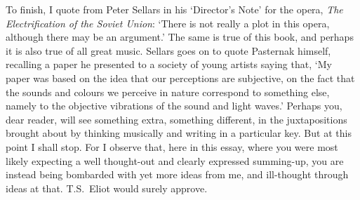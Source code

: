 To finish, I quote from Peter Sellars in his `Director's Note' for the
opera, \textit{The Electrification of the Soviet Union}: `There is not
really a plot in this opera, although there may be an argument.'  The
same is true of this book, and perhaps it is also true of all great music.  Sellars goes on to quote Pasternak
himself, recalling a paper he presented to a society of young artists
saying that, `My paper was based on the idea that our perceptions are
subjective, on the fact that the sounds and colours we perceive in
nature correspond to something else, namely to the objective
vibrations of the sound and light waves.'  Perhaps you, dear reader,
will see something extra, something different, in the juxtapositions
brought about by thinking musically and writing in a particular key.
But at this point I shall stop.  For I observe that, here in this essay, where
you were most likely expecting a well thought-out and clearly expressed summing-up, you
are instead being bombarded with yet more ideas from me, and ill-thought
through ideas at that.  T.S.~Eliot would surely approve.

